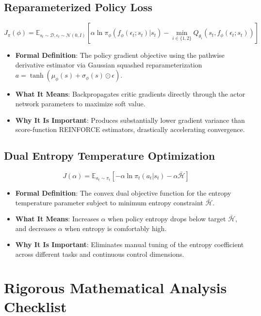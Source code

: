 \documentclass[11pt,a4paper]{article}
\theoremstyle{definition}
\begin{document}
\subsection{Reparameterized Policy Loss}
{\boldmath
\begin{equation}
J_\pi(\phi) = \mathbb{E}_{s_t \sim \mathcal{D}, \epsilon_t \sim \mathcal{N}(0, I)} \left[ \alpha \ln \pi_\phi(f_\phi(\epsilon_t; s_t) | s_t) - \min_{i \in \{1, 2\}} Q_{\theta_i}(s_t, f_\phi(\epsilon_t; s_t)) \right]
\end{equation}
}
\begin{itemize}
    \item \textbf{Formal Definition}: The policy gradient objective using the pathwise derivative estimator via Gaussian squashed reparameterization $a = \tanh(\mu_\phi(s) + \sigma_\phi(s) \odot \epsilon)$.
    \item \textbf{What It Means}: Backpropagates critic gradients directly through the actor network parameters to maximize soft value.
    \item \textbf{Why It Is Important}: Produces substantially lower gradient variance than score-function REINFORCE estimators, drastically accelerating convergence.
\end{itemize}

\subsection{Dual Entropy Temperature Optimization}
{\boldmath
\begin{equation}
J(\alpha) = \mathbb{E}_{a_t \sim \pi_t} \left[ -\alpha \ln \pi_t(a_t | s_t) - \alpha \bar{\mathcal{H}} \right]
\end{equation}
}
\begin{itemize}
    \item \textbf{Formal Definition}: The convex dual objective function for the entropy temperature parameter subject to minimum entropy constraint $\bar{\mathcal{H}}$.
    \item \textbf{What It Means}: Increases $\alpha$ when policy entropy drops below target $\bar{\mathcal{H}}$, and decreases $\alpha$ when entropy is comfortably high.
    \item \textbf{Why It Is Important}: Eliminates manual tuning of the entropy coefficient across different tasks and continuous control dimensions.
\end{itemize}

\section{Rigorous Mathematical Analysis Checklist}
\end{document}
